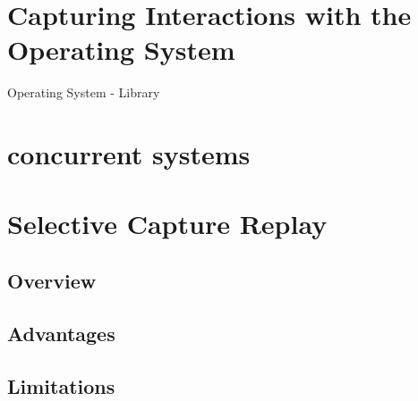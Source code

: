 \section {Capturing Interactions with the Operating System}
Operating System - Library
\section {concurrent systems}
\section{Selective Capture Replay}
\subsection{Overview}
\subsection{Advantages}
\subsection{Limitations}
